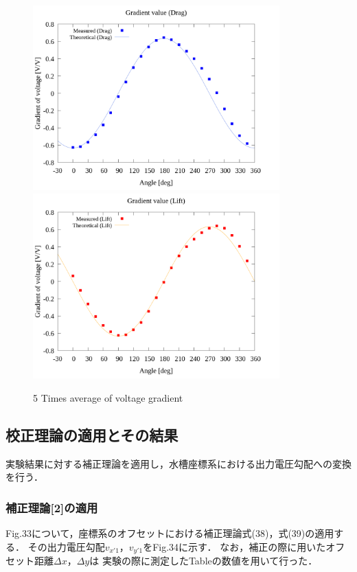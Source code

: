 \begin{figure}[htbp]
  \begin{center}
    \includegraphics[width=95mm]{../../02_workspace/result/2-ex/plot/21/21-1_summary_drag.png}
    \includegraphics[width=95mm]{../../02_workspace/result/2-ex/plot/21/21-1_summary_lift.png}
  \end{center}
  \caption{5 Times average of voltage gradient}
\end{figure}

\newpage

\subsection{校正理論の適用とその結果}
実験結果に対する補正理論を適用し，水槽座標系における出力電圧勾配への変換を行う．

\subsubsection{補正理論[2]の適用}
Fig.33について，座標系のオフセットにおける補正理論式(38)，式(39)の適用する．
その出力電圧勾配$v_{x'1}$，$v_{y'1}$をFig.34に示す．
なお，補正の際に用いたオフセット距離$\Delta x$，$\Delta y$は
実験の際に測定したTableの数値を用いて行った．

